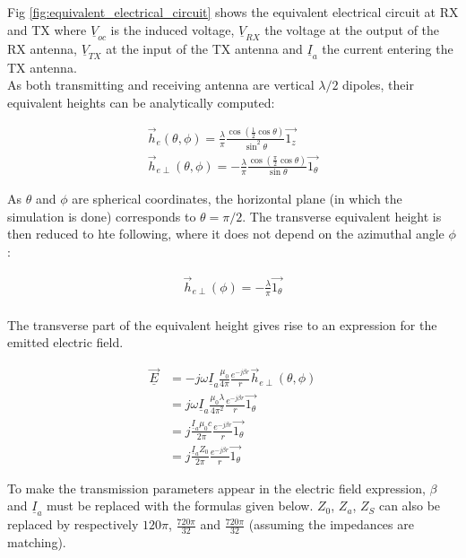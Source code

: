 \documentclass[10pt,a4paper]{ULBreport}
\begin{document}
Fig \ref{fig:equivalent_electrical_circuit} shows the equivalent electrical circuit at RX and TX where $\underline{V}_{oc}$ is the induced voltage, $\underline{V}_{RX}$ the voltage at the output of the RX antenna, $\underline{V}_{TX}$ at the input of the TX antenna and $\underline{I}_{a}$ the current entering the TX antenna.\\

As both transmitting and receiving antenna are vertical $\lambda/2$ dipoles, their equivalent heights can be analytically computed:

\begin{align*}
    \vec{h}_e (\theta, \phi) = \frac{\lambda}{\pi} \frac{\cos(\frac{1}{2}\cos \theta)}{\sin ^2 \theta}\vec{1_z}\\
    \vec{h}_{e\perp} (\theta, \phi) = -\frac{\lambda}{\pi} \frac{\cos(\frac{\pi}{2}\cos \theta)}{\sin \theta}\vec{1_\theta}
\end{align*}

As $\theta$ and $\phi$ are spherical coordinates, the horizontal plane (in which the simulation is done) corresponds to $\theta = \pi/2$. The transverse equivalent height is then reduced to hte following, where it does not depend on the azimuthal angle $\phi$:

\begin{align*}
    \vec{h}_{e\perp} (\phi) = -\frac{\lambda}{\pi} \vec{1_{\theta}}\\
\end{align*}

The transverse part of the equivalent height gives rise to an expression for the emitted electric field.

\begin{align*}
    \underline{\vec{E}} &= -j\omega \underline{I}_a \frac{\mu_0}{4\pi}\frac{e^{-j\beta r}}{r}\vec{h}_{e\perp}(\theta, \phi) \\
    &= j\omega \underline{I}_a \frac{\mu_0\lambda}{4\pi^2}\frac{e^{-j\beta r}}{r} \vec{1_{\theta}} \\
    &= j \frac{\underline{I}_a \mu_0 c}{2\pi} \frac{e^{-j\beta r}}{r} \vec{1_{\theta}}\\
    &= j \frac{\underline{I}_a Z_0}{2\pi} \frac{e^{-j\beta r}}{r} \vec{1_{\theta}}
\end{align*}

To make the transmission parameters appear in the electric field expression, $\beta$ and $\underline{I}_a$ must be replaced with the formulas given below. $Z_0$, $Z_a$, $Z_S$ can also be replaced by respectively $120\pi$, $\frac{720\pi}{32}$ and $\frac{720\pi}{32}$ (assuming the impedances are matching).
\end{document}
